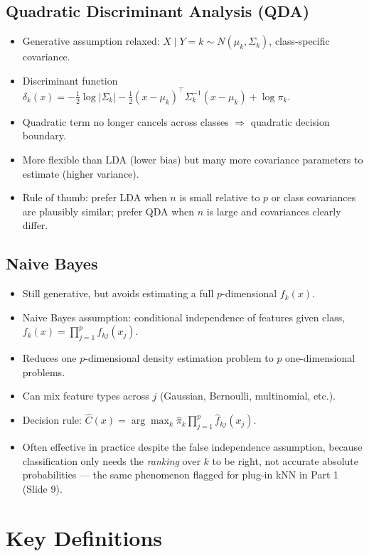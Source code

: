 \documentclass[11pt]{article}
\begin{document}
\subsection{Quadratic Discriminant Analysis (QDA)}
\begin{itemize}
\item Generative assumption relaxed: $X\mid Y=k \sim N(\mu_k,\Sigma_k)$, class-specific covariance.
\item Discriminant function $\delta_k(x) = -\tfrac12\log|\Sigma_k| - \tfrac12(x-\mu_k)^\top\Sigma_k^{-1}(x-\mu_k)+\log\pi_k$.
\item Quadratic term no longer cancels across classes $\Rightarrow$ quadratic decision boundary.
\item More flexible than LDA (lower bias) but many more covariance parameters to estimate (higher variance).
\item Rule of thumb: prefer LDA when $n$ is small relative to $p$ or class covariances are plausibly similar; prefer QDA when $n$ is large and covariances clearly differ.
\end{itemize}

\subsection{Naive Bayes}
\begin{itemize}
\item Still generative, but avoids estimating a full $p$-dimensional $f_k(x)$.
\item Naive Bayes assumption: conditional independence of features given class, $f_k(x)=\prod_{j=1}^p f_{kj}(x_j)$.
\item Reduces one $p$-dimensional density estimation problem to $p$ one-dimensional problems.
\item Can mix feature types across $j$ (Gaussian, Bernoulli, multinomial, etc.).
\item Decision rule: $\hat C(x) = \arg\max_k \hat\pi_k \prod_{j=1}^p \hat f_{kj}(x_j)$.
\item Often effective in practice despite the false independence assumption, because classification only needs the \emph{ranking} over $k$ to be right, not accurate absolute probabilities --- the same phenomenon flagged for plug-in kNN in Part 1 (Slide 9).
\end{itemize}

\section{Key Definitions}
\end{document}
